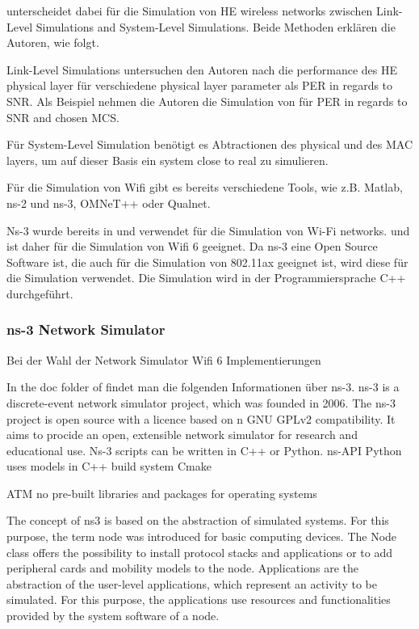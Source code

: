 \documentclass[]{nsm-thesis}
\begin{document}
\textcite{OmarHESurvey} unterscheidet dabei für die Simulation von HE wireless networks zwischen Link-Level Simulations and System-Level Simulations. Beide Methoden erklären die Autoren, wie folgt.

Link-Level Simulations untersuchen den Autoren nach die performance des HE physical layer für verschiedene physical layer parameter als \ac{PER} in regards to \ac{SNR}. Als Beispiel nehmen die Autoren die Simulation von \textcite{201} für PER in regards to SNR and chosen MCS.

Für System-Level Simulation benötigt es Abtractionen des physical und des MAC layers, um auf dieser Basis ein system close to real zu simulieren.

Für die Simulation von Wifi gibt es bereits verschiedene Tools, wie z.B. Matlab, ns-2 und ns-3, OMNeT++ oder Qualnet.

\cite{SimulationWifiMesh}
Ns-3 wurde bereits in \cite{ComparativeStudyKumar} und \cite{SimulationWifiMesh} verwendet für die Simulation von Wi-Fi networks. \textcite{} und ist daher für die Simulation von Wifi 6 geeignet.
Da ns-3 eine Open Source Software ist, die auch für die
Simulation von 802.11ax geeignet ist, wird diese für die Simulation verwendet. Die Simulation wird in der Programmiersprache C++ durchgeführt.


 
\subsubsection*{ns-3 Network Simulator}

Bei der Wahl der Network Simulator Wifi 6 Implementierungen 



In the doc folder of  \cite{noauthor_files_nodate} findet man die folgenden Informationen über ns-3.
ns-3 is a discrete-event network simulator project, which was founded in 2006.
The ns-3 project is open source with a licence based on n GNU GPLv2 compatibility.
It aims to procide an open, extensible network simulator for research and educational use. Ns-3 scripts can be written in C++ or Python.
ns-API Python uses models in C++
build system Cmake

ATM no pre-built libraries and packages for operating systems
 
The concept of ns3 is based on the abstraction of simulated systems.
For this purpose, the term node was introduced for basic computing devices. The Node class offers the possibility to
install protocol stacks and applications or to add peripheral cards and mobility models to the node.
Applications are the abstraction of the user-level applications, which represent an activity to be simulated.
For this purpose, the applications use resources and functionalities provided by the system software of a node.
\end{document}
